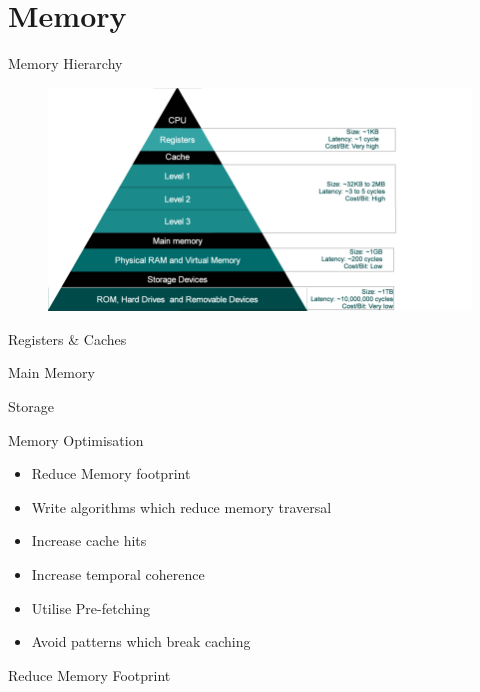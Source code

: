\part{Memory}
\frame{\partpage}

\begin{frame}{Memory Hierarchy}
\begin{figure}
	\includegraphics[width=1.0\textwidth,height=0.8\textheight]{Memory-hierarchy}  
\end{figure}
\end{frame}

\begin{frame}{Registers \& Caches}
\end{frame}

\begin{frame}{Main Memory}
\end{frame}

\begin{frame}{Storage}
\end{frame}

\begin{frame}{Memory Optimisation}
	\begin{itemize}
		\pause \item Reduce Memory footprint
		\pause \item Write algorithms which reduce memory traversal
		\pause \item Increase cache hits
		\pause \item Increase temporal coherence
		\pause \item Utilise Pre-fetching
		\pause \item Avoid patterns which break caching 
	\end{itemize}
\end{frame}

\begin{frame}{Reduce Memory Footprint}
\end{frame}

\